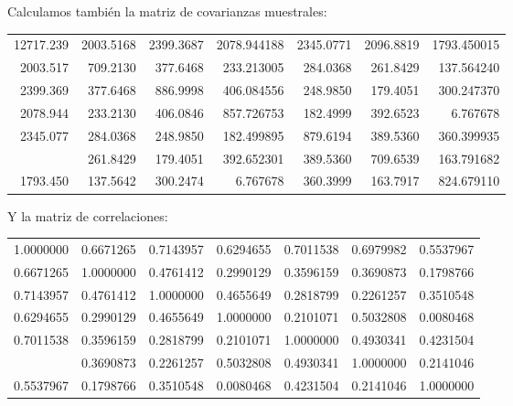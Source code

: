 \documentclass[
  11.8pt,
]{extreport}
\begin{document}
Calculamos también la matriz de covarianzas muestrales:

\begin{table}[H]
\centering\begingroup\fontsize{9}{11}\selectfont

\begin{tabular}{rrrrrrr}
\toprule
12717.239 & 2003.5168 & 2399.3687 & 2078.944188 & 2345.0771 & 2096.8819 & 1793.450015\\
2003.517 & 709.2130 & 377.6468 & 233.213005 & 284.0368 & 261.8429 & 137.564240\\
2399.369 & 377.6468 & 886.9998 & 406.084556 & 248.9850 & 179.4051 & 300.247370\\
2078.944 & 233.2130 & 406.0846 & 857.726753 & 182.4999 & 392.6523 & 6.767678\\
2345.077 & 284.0368 & 248.9850 & 182.499895 & 879.6194 & 389.5360 & 360.399935\\
\addlinespace
2096.882 & 261.8429 & 179.4051 & 392.652301 & 389.5360 & 709.6539 & 163.791682\\
1793.450 & 137.5642 & 300.2474 & 6.767678 & 360.3999 & 163.7917 & 824.679110\\
\bottomrule
\end{tabular}
\endgroup{}
\end{table}

Y la matriz de correlaciones:

\begin{table}[H]
\centering\begingroup\fontsize{9}{11}\selectfont

\begin{tabular}{rrrrrrr}
\toprule
1.0000000 & 0.6671265 & 0.7143957 & 0.6294655 & 0.7011538 & 0.6979982 & 0.5537967\\
0.6671265 & 1.0000000 & 0.4761412 & 0.2990129 & 0.3596159 & 0.3690873 & 0.1798766\\
0.7143957 & 0.4761412 & 1.0000000 & 0.4655649 & 0.2818799 & 0.2261257 & 0.3510548\\
0.6294655 & 0.2990129 & 0.4655649 & 1.0000000 & 0.2101071 & 0.5032808 & 0.0080468\\
0.7011538 & 0.3596159 & 0.2818799 & 0.2101071 & 1.0000000 & 0.4930341 & 0.4231504\\
\addlinespace
0.6979982 & 0.3690873 & 0.2261257 & 0.5032808 & 0.4930341 & 1.0000000 & 0.2141046\\
0.5537967 & 0.1798766 & 0.3510548 & 0.0080468 & 0.4231504 & 0.2141046 & 1.0000000\\
\bottomrule
\end{tabular}
\endgroup{}
\end{table}
\end{document}
